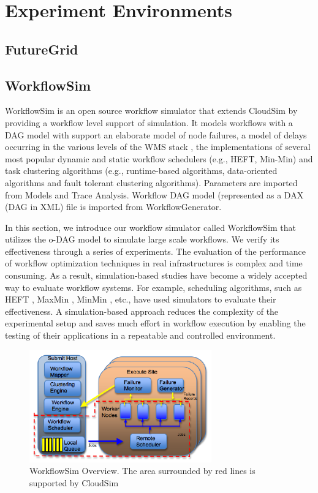 \chapter{Experiment Environments}

\section{FutureGrid}

\section{WorkflowSim}

WorkflowSim is an open source workflow simulator that extends CloudSim \cite{Calheiros2011} by providing a workflow level support of simulation. It models workflows with a DAG model with support an elaborate model of node failures, a model of delays occurring in the various levels of the WMS stack \cite{Chen2011}, the implementations of several most popular dynamic and static workflow schedulers (e.g., HEFT, Min-Min) and task clustering algorithms (e.g., runtime-based algorithms, data-oriented algorithms and fault tolerant clustering algorithms). Parameters are imported from Models and Trace Analysis. Workflow DAG model (represented as a DAX (DAG in XML) file is imported from WorkflowGenerator.  

In this section, we introduce our workflow simulator called WorkflowSim that utilizes the o-DAG model to simulate large scale workflows. We verify its effectiveness through a series of experiments. The evaluation of the performance of workflow optimization techniques in real infrastructures is complex and time consuming. As a result, simulation-based studies have become a widely accepted way to evaluate workflow systems. For example, scheduling algorithms, such as HEFT \cite{Topcuoglu2002}, MaxMin \cite{Braun2001}, MinMin \cite{Blythe2005}, etc., have used simulators to evaluate their effectiveness. A simulation-based approach reduces the complexity of the experimental setup and saves much effort in workflow execution by enabling the testing of their applications in a repeatable and controlled environment. 


\begin{figure}[h!]
	\centering
    \includegraphics[width=0.7\textwidth]{figures/model/wfs_overview.pdf}
    \caption{WorkflowSim Overview. The area surrounded by red lines is supported by CloudSim}
    \label{fig:model_wfs_overview}
\end{figure}

